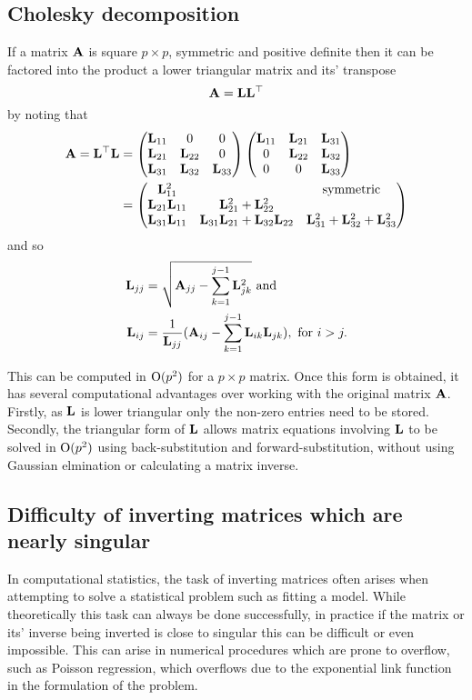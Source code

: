 \documentclass{amsart}[12pt]
\begin{document}
\subsection{Cholesky decomposition}

If a matrix ${\bf A}$ is square $p \times p$, symmetric and positive definite then it can be factored into the
product a lower triangular matrix and its' transpose
\[
	{\bf A} = {\bf L} {\bf L}^\top
\]
by noting that
\begin{align*}
	{\bf A} = {\bf L}^\top {\bf L} &= \begin{pmatrix}
		{\bf L}_{11} & 0 & 0 \\
		{\bf L}_{21} & {\bf L}_{22} & 0 \\
		{\bf L}_{31} & {\bf L}_{32} & {\bf L}_{33}
	\end{pmatrix}
	\begin{pmatrix}
		{\bf L}_{11} & {\bf L}_{21} & {\bf L}_{31} \\
		0 & {\bf L}_{22} & {\bf L}_{32} \\
		0 & 0 & {\bf L}_{33}
	\end{pmatrix}	\\
	&= \begin{pmatrix}
	{\bf L}_{11}^2 & & \text{symmetric} \\
	{\bf L}_{21} {\bf L}_{11} & {\bf L}_{21}^2 + {\bf L}_{22}^2 & \\
	{\bf L}_{31} {\bf L}_{11} & {\bf L}_{31} {\bf L}_{21} + {\bf L}_{32} {\bf L}_{22} & {\bf L}_{31}^2 + {\bf L}_{32}^2 + {\bf L}_{33}^2
	\end{pmatrix}
\end{align*}
and so
\begin{align*}
	{\bf L}_{jj} &= \sqrt{{\bf A}_{jj} - \sum_{k=1}^{j-1} {\bf L}_{jk}^2} \text{ and}\\
	{\bf L}_{ij} &= \frac{1}{{\bf L}_{jj}} ({\bf A}_{ij} - \sum_{k=1}^{j-1} {\bf L}_{ik} {\bf L}_{jk}), \text{ for } i > j.
\end{align*}

This can be computed in $\text{O}(p^2)$ for a $p \times p$ matrix. Once this form is obtained, it has several
computational advantages over working with the original matrix ${\bf A}$. Firstly, as ${\bf L}$ is lower triangular
only the non-zero entries need to be stored. Secondly, the triangular form of ${\bf L}$ allows matrix equations
involving ${\bf L}$ to be solved in $\text{O}{(p^2)}$ using back-substitution and forward-substitution, without using
Gaussian elmination or calculating a matrix inverse.

\subsection{Difficulty of inverting matrices which are nearly singular}
In computational statistics, the task of inverting matrices often arises when
attempting to solve a statistical problem such as fitting a model. While theoretically this task can always be
done successfully, in practice if the matrix or its' inverse being inverted is close to singular this can be
difficult or even impossible. This can arise in numerical procedures which are prone to overflow, such as
Poisson regression, which overflows due to the exponential link function in the formulation of the problem.
\end{document}
